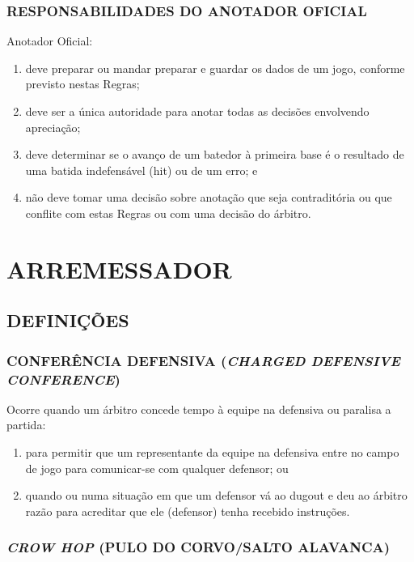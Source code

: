 \subsection{RESPONSABILIDADES DO ANOTADOR OFICIAL}

Anotador Oficial:

\begin{enumerate}[label=(\alph*)]\item   deve preparar ou mandar preparar e guardar os dados de um jogo, conforme previsto nestas Regras;
	\item  deve ser a única autoridade para anotar todas as decisões envolvendo apreciação;
	\item  deve determinar se o avanço de um batedor à primeira base é o resultado de uma batida indefensável (hit) ou de um erro; e
	\item  não deve tomar uma decisão sobre anotação que seja contraditória ou que conflite com estas Regras ou com uma decisão do árbitro.
\end{enumerate}

\chapter{ARREMESSADOR}
\minitoc%

\section{DEFINIÇÕES}
\subsection{CONFERÊNCIA DEFENSIVA (\textit{CHARGED DEFENSIVE CONFERENCE})}

Ocorre quando um árbitro concede tempo à equipe na defensiva ou paralisa a  partida:

\begin{enumerate}[label=(\alph*)]
	\item para permitir que um representante da equipe na defensiva entre no campo de jogo para comunicar-se com qualquer defensor; ou
	\item quando ou numa situação em que um defensor vá ao \gls{dugout} e deu ao árbitro razão para acreditar que ele (defensor) tenha recebido instruções.
\end{enumerate}

\subsection{\textit{CROW HOP} (PULO DO CORVO/SALTO ALAVANCA)}

